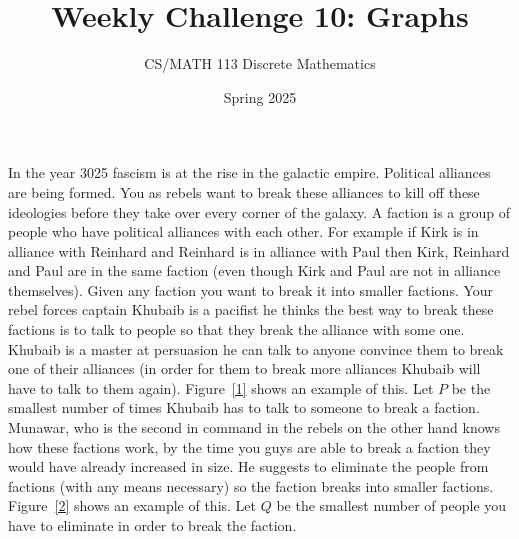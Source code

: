 \documentclass[a4paper]{exam}
\title{Weekly Challenge 10: Graphs}
\author{CS/MATH 113 Discrete Mathematics}
\date{Spring 2025}
\begin{document}
\maketitle



\begin{questions}
    In the year 3025 fascism is at the rise in the galactic empire. Political alliances are being formed. You as rebels want to break these alliances to kill off these ideologies before they take over every corner of the galaxy. 
    A faction is a group of people who have political alliances with each other. For example if Kirk is in alliance with Reinhard and Reinhard is in alliance with Paul then Kirk, Reinhard and Paul are in the same faction (even though Kirk and Paul are not in alliance themselves). Given any faction you want to break it into smaller factions.
    Your rebel forces captain Khubaib is a pacifist he thinks the best way to break these factions is to talk to people so that they break the alliance with some one. Khubaib is a master at persuasion he can talk to anyone convince them to break one of their alliances (in order for them to break more alliances Khubaib will have to talk to them again). Figure~\ref{1} shows an example of this. 
    Let $P$ be the smallest number of times Khubaib has to talk to someone to break a faction. 
    Munawar, who is the second in command in the rebels on the other hand knows how these factions work, by the time you guys are able to break a faction they would have already increased in size. He suggests to eliminate the people from factions (with any means necessary) so the faction breaks into smaller factions. Figure~\ref{2} shows an example of this. 
    Let $Q$ be the smallest number of people you have to eliminate in order to break the faction. 


\end{questions}
\end{document}
